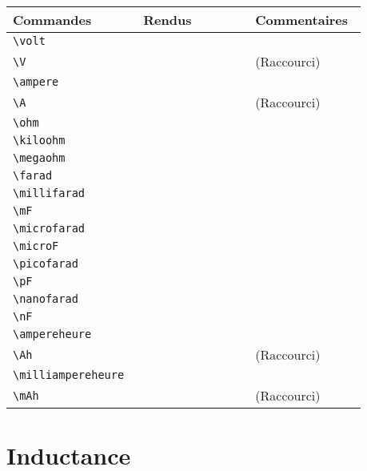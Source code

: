 \documentclass[a4paper,12pt]{article}
\newcommand{\rac}{({\color{red}Raccourci})}
\begin{document}
	
	\noindent
	\begin{tabular}{|p{0.35\linewidth}|p{0.3\linewidth}|p{0.3\linewidth}|}
		\hline
 			\textbf{Commandes}&\textbf{Rendus}&\textbf{Commentaires}
 		\\\hline\hline
			\verb!\volt!	& 	\volt	&	\\
		\hline
			\verb!\V!	& 	\V	&	\rac\\
		\hline
			\verb!\ampere!	& 	\ampere	&	\\
		\hline
			\verb!\A!	& 	\A	&	\rac\\
		\hline
			\verb!\ohm!	& 	\ohm	&	\\
		\hline
			\verb!\kiloohm!	& 	\kiloohm	&	\\
		\hline
			\verb!\megaohm!	& 	\megaohm	&	\\
		\hline
			\verb!\farad!	& 	\farad	&	\\
		\hline
			\verb!\millifarad!	& 	\millifarad	&	\\
		\hline
			\verb!\mF!	& 	\mF	&	\\
		\hline
			\verb!\microfarad!	& 	\microfarad	&	\\
		\hline
			\verb!\microF!	& 	\microF	&	\\
		\hline
			\verb!\picofarad!	& 	\picofarad	&	\\
		\hline
			\verb!\pF!	& 	\pF	&	\\
		\hline
			\verb!\nanofarad!	& 	\nanofarad	&	\\
		\hline
			\verb!\nF!	& 	\nF	&	\\
		\hline
			\verb!\ampereheure!	& 	\ampereheure	&	\\
		\hline
			\verb!\Ah!	& 	\Ah	&	\rac\\
		\hline
			\verb!\milliampereheure!	& 	\milliampereheure	&	\\
		\hline
			\verb!\mAh!	& 	\mAh	&	\rac\\
		\hline
	\end{tabular}
	
	
	
	\section{Inductance}
	
\end{document}
